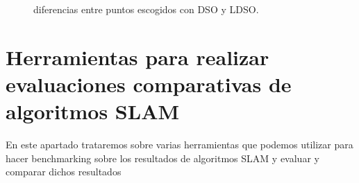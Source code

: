 \begin{figure}[H]
\begin{center}
\end{center}
\caption{diferencias entre puntos escogidos con DSO y LDSO.}
\end{figure}


\section{Herramientas para realizar evaluaciones comparativas de algoritmos SLAM}
En este apartado trataremos sobre varias herramientas que podemos utilizar para hacer benchmarking sobre los resultados de algoritmos SLAM y evaluar y comparar dichos resultados


